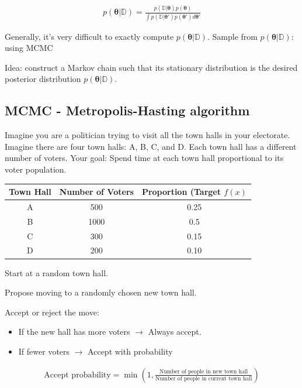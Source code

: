 \begin{align*}
    p(\boldsymbol{\theta}|\mathbb{D}) = \frac{p(\mathbb{D}|\boldsymbol{\theta})p(\boldsymbol{\theta})}{\int p(\mathbb{D}|\boldsymbol{\theta'})p(\boldsymbol{\theta'})d\boldsymbol{\theta'}}
\end{align*}

Generally, it’s very difficult to exactly compute $p(\boldsymbol{\theta}|\mathbb{D})$. Sample from $p(\boldsymbol{\theta}|\mathbb{D})$: using MCMC

Idea: construct a Markov chain such that its stationary distribution is the desired posterior distribution $p(\boldsymbol{\theta}|\mathbb{D})$.

\subsection{MCMC - Metropolis-Hasting algorithm}

\indent 

Imagine you are a politician trying to visit all the town halls in your electorate. Imagine there are four town halls: A, B, C, and D. Each town hall has a different number of voters. Your goal: Spend time at each town hall proportional to its voter population.

\begin{table}[h!]
    \centering
    \begin{tabular}{ccc}
        \hline
        \textbf{Town Hall} & \textbf{Number of Voters} & \textbf{Proportion (Target $f(x)$}\\\hline
        A & 500 & 0.25\\
        B & 1000 & 0.5\\
        C & 300 & 0.15\\
        D & 200 & 0.10\\\hline
    \end{tabular}
\end{table}

\step Start at a random town hall.

\step Propose moving to a randomly chosen new town hall.

\step Accept or reject the move:
\begin{itemize}
    \item If the new hall has more voters $\rightarrow$ Always accept.
    \item If fewer voters $\rightarrow$ Accept with probability
\end{itemize}

\begin{align*}
    \text{Accept probability} = \min \left(1,\frac{\text{Number of people in new town hall}}{\text{Number of people in current town hall}}\right)
\end{align*}

